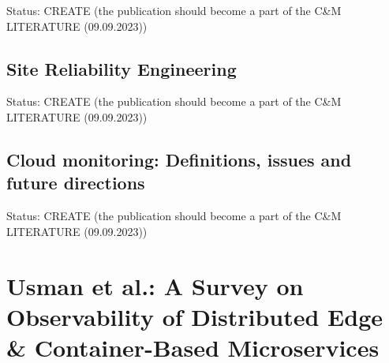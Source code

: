 
Status: CREATE (the publication should become a part of the C\&M LITERATURE  (09.09.2023))

\subsection*{Site Reliability Engineering \cite{BJ+16}}


Status: CREATE (the publication should become a part of the C\&M LITERATURE  (09.09.2023))

\subsection*{Cloud monitoring: Definitions, issues and future directions \cite{AB+12}}


Status: CREATE (the publication should become a part of the C\&M LITERATURE  (09.09.2023))


\section{Usman et al.: A Survey on Observability of Distributed Edge \& Container-Based Microservices}
\label{sec:uf+22}

